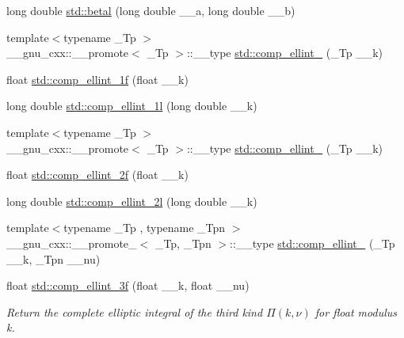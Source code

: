 \begin{DoxyCompactItemize}
\item 
long double \hyperlink{group__tr29124__math__spec__func_ga8caca1cef099f41a88111209c36ce06c}{std\+::betal} (long double \+\_\+\+\_\+a, long double \+\_\+\+\_\+b)
\item 
{\footnotesize template$<$typename \+\_\+\+Tp $>$ }\\\+\_\+\+\_\+gnu\+\_\+cxx\+::\+\_\+\+\_\+promote$<$ \+\_\+\+Tp $>$\+::\+\_\+\+\_\+type \hyperlink{group__tr29124__math__spec__func_gac559500c604c43ea943d593c9ad9d289}{std\+::comp\+\_\+ellint\+\_} (\+\_\+\+Tp \+\_\+\+\_\+k)
\item 
float \hyperlink{group__tr29124__math__spec__func_ga7fb5be999a8125cf7e55e630eb8444a1}{std\+::comp\+\_\+ellint\+\_\+1f} (float \+\_\+\+\_\+k)
\item 
long double \hyperlink{group__tr29124__math__spec__func_ga7247d3dd77c1ff5df3c059fed862dc48}{std\+::comp\+\_\+ellint\+\_\+1l} (long double \+\_\+\+\_\+k)
\item 
{\footnotesize template$<$typename \+\_\+\+Tp $>$ }\\\+\_\+\+\_\+gnu\+\_\+cxx\+::\+\_\+\+\_\+promote$<$ \+\_\+\+Tp $>$\+::\+\_\+\+\_\+type \hyperlink{group__tr29124__math__spec__func_ga22fcc678829f0daf2de257896378e7e0}{std\+::comp\+\_\+ellint\+\_} (\+\_\+\+Tp \+\_\+\+\_\+k)
\item 
float \hyperlink{group__tr29124__math__spec__func_ga21700f2f125c42b1f1da1f9c7eea1135}{std\+::comp\+\_\+ellint\+\_\+2f} (float \+\_\+\+\_\+k)
\item 
long double \hyperlink{group__tr29124__math__spec__func_ga47b647ec386c8d4b18a030c97842df18}{std\+::comp\+\_\+ellint\+\_\+2l} (long double \+\_\+\+\_\+k)
\item 
{\footnotesize template$<$typename \+\_\+\+Tp , typename \+\_\+\+Tpn $>$ }\\\+\_\+\+\_\+gnu\+\_\+cxx\+::\+\_\+\+\_\+promote\+\_$<$ \+\_\+\+Tp, \+\_\+\+Tpn $>$\+::\+\_\+\+\_\+type \hyperlink{group__tr29124__math__spec__func_gad833404645e24b7f0598a640ff92d623}{std\+::comp\+\_\+ellint\+\_} (\+\_\+\+Tp \+\_\+\+\_\+k, \+\_\+\+Tpn \+\_\+\+\_\+nu)
\item 
float \hyperlink{group__tr29124__math__spec__func_ga76834d3112f777703330892303267a39}{std\+::comp\+\_\+ellint\+\_\+3f} (float \+\_\+\+\_\+k, float \+\_\+\+\_\+nu)
\begin{DoxyCompactList}\small\item\em Return the complete elliptic integral of the third kind $ \Pi(k,\nu) $ for {\ttfamily float} modulus {\ttfamily k}. \end{DoxyCompactList}\item 

\end{DoxyCompactItemize}
